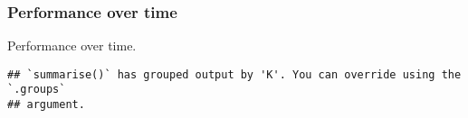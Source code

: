 \documentclass[]{book}
\newenvironment{Shaded}{\begin{snugshade}}{\end{snugshade}}
\newcommand{\DataTypeTok}[1]{\textcolor[rgb]{0.13,0.29,0.53}{#1}}
\newcommand{\KeywordTok}[1]{\textcolor[rgb]{0.13,0.29,0.53}{\textbf{#1}}}
\newcommand{\NormalTok}[1]{#1}
\newcommand{\OperatorTok}[1]{\textcolor[rgb]{0.81,0.36,0.00}{\textbf{#1}}}
\newcommand{\StringTok}[1]{\textcolor[rgb]{0.31,0.60,0.02}{#1}}
\begin{document}
\hypertarget{performance-over-time-24}{%
\subsubsection{Performance over time}\label{performance-over-time-24}}

Performance over time.

\begin{Shaded}
\end{Shaded}

\begin{verbatim}
## `summarise()` has grouped output by 'K'. You can override using the `.groups`
## argument.
\end{verbatim}
\end{document}
